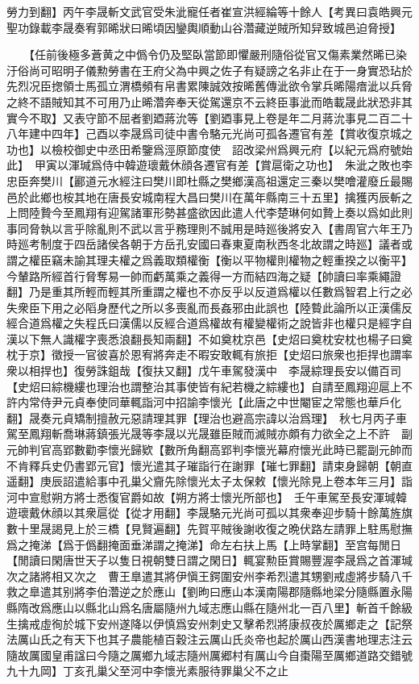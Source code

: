 勞力到翻】丙午李晟斬文武官受朱泚寵任者崔宣洪經綸等十餘人【考異曰袁皓興元聖功錄載李晟奏宥郭晞狀曰晞頃因鑾輿順動山谷濳藏逆賊所知舁致城邑迫脅授】

　　【任前後極多蒼黄之中僞令仍及堅臥當節即懼嚴刑隨俗從官又傷素業然晞已染汙俗尚可昭明子儀勲勞書在王府父為中興之佐子有疑謗之名非止在于一身實恐玷於先烈况臣揔領士馬孤立渭橋頻有帛書累陳誠效按晞舊傳泚欲令掌兵晞陽瘖泚以兵脅之終不語賊知其不可用乃止晞濳奔奉天從駕還京不云終臣事泚而皓載晟此狀恐非其實今不取】又表守節不屈者劉廼蔣沇等【劉廼事見上卷是年二月蔣沇事見二百二十八年建中四年】己酉以李晟爲司徒中書令駱元光尚可孤各遷官有差【賞收復京城之功也】以檢校御史中丞田希鑒爲涇原節度使　詔改梁州爲興元府【以紀元爲府號始此】　甲寅以渾瑊爲侍中韓遊瓌戴休顔各遷官有差【賞扈衛之功也】　朱泚之敗也李忠臣奔樊川【酈道元水經注曰樊川即杜縣之樊鄉漢高祖還定三秦以樊噲灌廢丘最賜邑於此鄉也桉其地在唐長安城南程大昌曰樊川在萬年縣南三十五里】擒獲丙辰斬之　上問陸贄今至鳳翔有迎駕諸軍形勢甚盛欲因此遣人代李楚琳何如贄上奏以爲如此則事同脅執以言乎除亂則不武以言乎務理則不誠用是時廵後將安入【書周官六年王乃時廵考制度于四岳諸侯各朝于方岳孔安國曰春東夏南秋西冬北故謂之時廵】議者或謂之權臣竊未諭其理夫權之爲義取類權衡【衡以平物權則權物之輕重揆之以衡平】今輦路所經首行脅奪易一帥而虧萬乘之義得一方而結四海之疑【帥讀曰率乘繩證翻】乃是重其所輕而輕其所重謂之權也不亦反乎以反道爲權以任數爲智君上行之必失衆臣下用之必䧟身歷代之所以多喪亂而長姦邪由此誤也【陸䞇此論所以正漢儒反經合道爲權之失程氏曰漢儒以反經合道爲權故有權變權術之說皆非也權只是經字自漢以下無人識權字喪悉浪翻長知兩翻】不如奠枕京邑【史炤曰奠枕安枕也楊子曰奠枕于京】徵授一官彼喜於恩宥將奔走不暇安敢輒有旅拒【史炤曰旅衆也拒捍也謂率衆以相捍也】復勞誅鉏哉【復扶又翻】戊午車駕發漢中　李晟綜理長安以備百司【史炤曰綜機縷也理治也謂整治其事使皆有紀若機之綜縷也】自請至鳳翔迎扈上不許内常侍尹元貞奉使同華輒詣河中招諭李懷光【此唐之中世閹宦之常態也華戶化翻】晟奏元貞矯制擅赦元惡請理其罪【理治也避高宗諱以治爲理】　秋七月丙子車駕至鳳翔斬喬琳蔣鎮張光晟等李晟以光晟雖臣賊而滅賊亦頗有力欲全之上不許　副元帥判官高郢數勸李懷光歸欵【數所角翻高郢判李懷光幕府懷光此時已罷副元帥而不肯釋兵史仍書郢元官】懷光遣其子璀詣行在謝罪【璀七罪翻】請束身歸朝【朝直遥翻】庚辰詔遣給事中孔巢父齎先除懷光太子太保敕【懷光除見上卷本年三月】詣河中宣慰朔方將士悉復官爵如故【朔方將士懷光所部也】　壬午車駕至長安渾瑊韓遊瓌戴休顔以其衆扈從【從才用翻】李晟駱元光尚可孤以其衆奉迎步騎十餘萬旌旗數十里晟謁見上於三橋【見賢遍翻】先賀平賊後謝收復之晩伏路左請罪上駐馬慰撫爲之掩涕【爲于僞翻掩面垂涕謂之掩涕】命左右扶上馬【上時掌翻】至宫每閒日【閒讀曰閑唐世天子以隻日視朝雙日謂之閑日】輒宴勲臣賞賜豐渥李晟爲之首渾瑊次之諸將相又次之　曹王臯遣其將伊愼王鍔圍安州李希烈遣其甥劉戒虛將步騎八千救之臯遣其别將李伯濳逆之於應山【劉昫曰應山本漢南陽郡隨縣地梁分隨縣置永陽縣隋改爲應山以縣北山爲名唐屬隨州九域志應山縣在隨州北一百八里】斬首千餘級生擒戒虛徇於城下安州遂降以伊慎爲安州刺史又擊希烈將康叔夜於厲鄉走之【記祭法厲山氏之有天下也其子農能植百穀注云厲山氏炎帝也起於厲山西漢書地理志注云隨故厲國皇甫諡曰今隨之厲鄉九域志隨州厲郷村有厲山今自棗陽至厲鄉道路交錯號九十九岡】丁亥孔巢父至河中李懷光素服待罪巢父不之止

